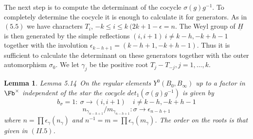 \documentclass{memo-l}
\newtheorem{lemma}[theorem]{Lemma}
\theoremstyle{definition}
\theoremstyle{remark}
\numberwithin{section}{chapter}
\numberwithin{equation}{chapter}
\begin{document}
   The next step is to compute the determinant of the cocycle
${\sigma}(g)g^{-1}$.  To completely determine the cocycle it is enough to
calculate it for generators.  As in $(5.5)$ we have characters $T_{i}$,
$-k \le i \le k \ (2k+1-{\epsilon} = n$.  The Weyl group of $\underline{H}$ is then
generated by the simple reflections $(i,i+1)\  i \ne  k-h, -k+h-1$ together
with the involution ${\epsilon}_{k-h+1}  =  (k-h+1,-k+h-1)$.  Thus it is
sufficient to calculate the determinant on these generators together with
the outer automorphism ${\sigma}_{0}$.  We let ${\gamma}_{j}$ be the
positive root $T_{j}-T_{-j}, j = 1,\ldots ,k$.


\begin{lemma}{Lemma 5.14}\ On the regular elements
$Y^{0}(B_{0},B_{{\infty}})$ up to a factor in $\Fb ^{\times}$ independent of
the star the cocycle $det_{1}({\sigma}(g)g^{-1})$ is given by
$$
b_{{\sigma}}  =  1 : \ {\sigma} {\to} (i,i+1) \quad i \ne  k-h, -k+h-1
$$
$$
n_{{\gamma_{n-h+1}}} /m_{{\gamma_{n-h+1}}} : {\sigma} {\to}
{\epsilon}_{n-h+1}
$$
where $n  = \prod {\epsilon}_{{\gamma}}(n_{{\gamma}})$ and $n^{-1}  =  m
= \prod{\epsilon}_{{\gamma}}(m_{{\gamma}})$.  The order
on the roots is that given in $(II.5)$.
\end{lemma}
\end{document}
